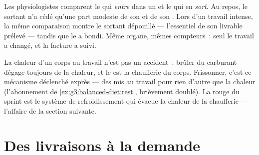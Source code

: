 \begin{example}\label{ex:g7:organs-at-work:measure}
Les physiologistes comparent le  qui \emph{entre} dans un 
et le  qui en \emph{sort}. Au repos, le  sortant n'a cédé
qu'une part modeste de son  et de son . Lors d'un
travail intense, la même comparaison montre le  sortant dépouillé
--- l'essentiel de son  livrable prélevé --- tandis que le
 a bondi. Même organe, mêmes compteurs~: seul le
travail a changé, et la facture a suivi.
\end{example}

\begin{remark}\label{rem:g7:organs-at-work:warmth}
La chaleur d'un corps au travail n'est pas un accident~: brûler du
carburant dégage toujours de la chaleur, et le  est la
chaufferie du corps. Frissonner, c'est ce mécanisme déclenché
exprès --- des  mis au travail pour rien d'autre que la
chaleur (l'abonnement de \cref{ex:g3:balanced-diet:rest}, brièvement
doublé). La  rouge du sprint est le système de refroidissement
qui évacue la chaleur de la chaufferie --- l'affaire de la section
suivante.
\end{remark}

\section{Des livraisons à la demande}

